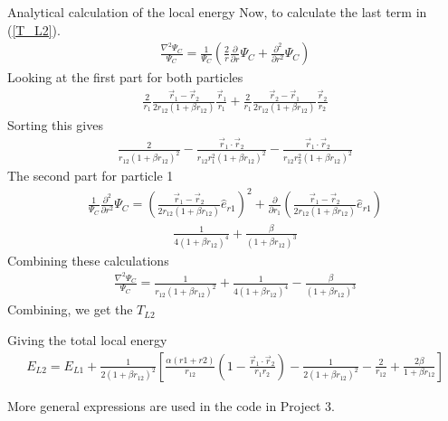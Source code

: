 \documentclass[a4paper, 12pt, titlepage]{article}
\begin{document}
\begin{section}{Analytical calculation of the local energy}
 Now, to calculate the last term in (\ref{T_L2}). 
 \begin{align}
 	\frac{\nabla^2 \Psi_C}{\Psi_C} = \frac{1}{\Psi_C} \left( \frac{2}{r} \frac{\partial}{\partial r}\Psi_C + \frac{\partial^2 }{\partial r^2} \Psi_C \right)
 \end{align}
 Looking at the first part for both particles
 \begin{align*}
 	\frac{2}{r_1} \frac{\vec r_1 - \vec r_2}{2r_{12} \left(1+\beta r_{12} \right)} \frac{\vec r_1}{r_1} + \frac{2}{r_1} \frac{\vec r_2 - \vec r_1}{2r_{12} \left(1+\beta r_{12} \right)} \frac{\vec r_2}{r_2}
 \end{align*}
 Sorting this gives
 \begin{align*}
 	\frac{2}{r_{12}(1+\beta r_{12})^2} - \frac{\vec r_1 \cdot \vec r_2}{r_{12} r_1^2 (1 +\beta r_{12})^2} - \frac{\vec r_1 \cdot \vec r_2}{r_{12} r_2^2 (1+\beta r_{12})^2}
 \end{align*}
 The second part for particle 1
 \begin{align*}
 	\frac{1}{\Psi_C} \frac{\partial^2 }{\partial r^2} \Psi_C = \left( \frac{\vec r_1 - \vec r_2}{2r_{12} \left(1+\beta r_{12} \right)} \hat e_{r1} \right)^2 + \frac{\partial}{\partial r_1} \left( \frac{\vec r_1 - \vec r_2}{2r_{12} \left(1+\beta r_{12}  \right)} \hat e_{r1} \right) 
 \end{align*}
 \begin{align*}
 	\frac{1}{4(1+\beta r_{12})^4} + \frac{\beta}{(1+\beta r_{12})^3}
 \end{align*}
 Combining these calculations
 \begin{align*}
 	 \frac{\nabla^2 \Psi_C}{\Psi_C} = \frac{1}{r_{12}(1+\beta r_{12})^2} + \frac{1}{4(1+\beta r_{12})^4} - \frac{\beta}{(1+\beta r_{12})^3}
 \end{align*}
 Combining, we get the $T_{L2}$
 
 Giving the total local energy
 \begin{align*}
 	E_{L2} = E_{L1} + \frac{1}{2(1+\beta r_{12})^2} \left[ \frac{\alpha (r1+r2)}{r_{12}} \left(1 - \frac{\vec r_1 \cdot \vec r_2}{r_1 r_2} \right) - \frac{1}{2(1+\beta r_{12})^2} - \frac{2}{r_{12}} + \frac{2 \beta}{1 + \beta r_{12}} \right]
 \end{align*}

 More general expressions are used in the code in Project 3. 
 \end{section}
\end{document}
